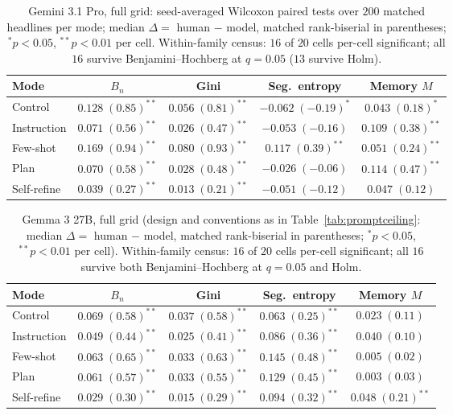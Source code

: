 \documentclass{article}
\begin{document}
\begin{table}[htbp]
\centering
\small
\caption{Gemini 3.1 Pro, full grid: seed-averaged Wilcoxon paired tests over $200$ matched headlines per mode; median $\Delta =$ human $-$ model, matched rank-biserial in parentheses; $^{*}p<0.05$, $^{**}p<0.01$ per cell. Within-family census: $16$ of $20$ cells per-cell significant; all $16$ survive Benjamini--Hochberg at $q=0.05$ ($13$ survive Holm).}
\label{tab:grid-gemini-31-pro}
\begin{tabular}{lcccc}
\toprule
Mode & $B_n$ & Gini & Seg.\ entropy & Memory $M$ \\
\midrule
Control & $0.128\;(0.85)^{**}$ & $0.056\;(0.81)^{**}$ & $-0.062\;(-0.19)^{*}$ & $0.043\;(0.18)^{*}$ \\
Instruction & $0.071\;(0.56)^{**}$ & $0.026\;(0.47)^{**}$ & $-0.053\;(-0.16)$ & $0.109\;(0.38)^{**}$ \\
Few-shot & $0.169\;(0.94)^{**}$ & $0.080\;(0.93)^{**}$ & $0.117\;(0.39)^{**}$ & $0.051\;(0.24)^{**}$ \\
Plan & $0.070\;(0.58)^{**}$ & $0.028\;(0.48)^{**}$ & $-0.026\;(-0.06)$ & $0.114\;(0.47)^{**}$ \\
Self-refine & $0.039\;(0.27)^{**}$ & $0.013\;(0.21)^{**}$ & $-0.051\;(-0.12)$ & $0.047\;(0.12)$ \\
\bottomrule
\end{tabular}
\end{table}

\begin{table}[htbp]
\centering
\small
\caption{Gemma 3 27B, full grid (design and conventions as in Table~\ref{tab:promptceiling}: median $\Delta =$ human $-$ model, matched rank-biserial in parentheses; $^{*}p<0.05$, $^{**}p<0.01$ per cell). Within-family census: $16$ of $20$ cells per-cell significant; all $16$ survive both Benjamini--Hochberg at $q=0.05$ and Holm.}
\label{tab:grid-gemma-3-27b}
\begin{tabular}{lcccc}
\toprule
Mode & $B_n$ & Gini & Seg.\ entropy & Memory $M$ \\
\midrule
Control & $0.069\;(0.58)^{**}$ & $0.037\;(0.58)^{**}$ & $0.063\;(0.25)^{**}$ & $0.023\;(0.11)$ \\
Instruction & $0.049\;(0.44)^{**}$ & $0.025\;(0.41)^{**}$ & $0.086\;(0.36)^{**}$ & $0.040\;(0.10)$ \\
Few-shot & $0.063\;(0.65)^{**}$ & $0.033\;(0.63)^{**}$ & $0.145\;(0.48)^{**}$ & $0.005\;(0.02)$ \\
Plan & $0.061\;(0.57)^{**}$ & $0.033\;(0.55)^{**}$ & $0.129\;(0.45)^{**}$ & $0.003\;(0.03)$ \\
Self-refine & $0.029\;(0.30)^{**}$ & $0.015\;(0.29)^{**}$ & $0.094\;(0.32)^{**}$ & $0.048\;(0.21)^{**}$ \\
\bottomrule
\end{tabular}
\end{table}
\end{document}
